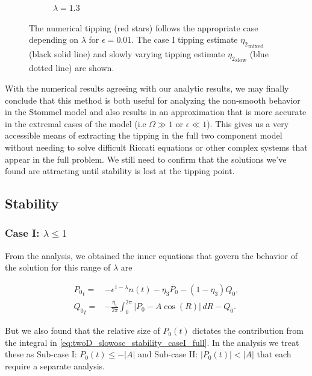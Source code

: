 \begin{figure}[H]
\begin{subfigure}{.5\textwidth}
 \caption{$\lambda=1.3$}
\end{subfigure}
\caption{The numerical tipping (red stars) follows the appropriate case depending on $\lambda$ for $\epsilon=0.01$. The case I tipping estimate ${\eta_2}_{\text{mixed}}$ (black solid line) and slowly varying tipping estimate ${\eta_2}_{\text{slow}}$ (blue dotted line) are shown.}
\label{fig:twoD_slowosc_epscomp}
\end{figure}

\indent With the numerical results agreeing with our analytic results, we may finally conclude that this method is both useful for analyzing the non-smooth behavior in the Stommel model and also results in an approximation that is more accurate in the extremal cases of the model (i.e $\Omega \gg 1$ or $\epsilon \ll 1$). This gives us a very accessible means of extracting the tipping in the full two component model without needing to solve difficult Riccati equations or other complex systems that appear in the full problem. We still need to confirm that the solutions we've found are attracting until stability is lost at the tipping point.

\subsection{Stability}

\subsubsection{Case I: $\lambda\le 1$}

From the analysis, we obtained the inner equations that govern the behavior of the solution for this range of $\lambda$ are

\begin{equation}\label{eq:twoD_slowosc_stability_caseI_full}
\begin{aligned}
{P_0}_t =& -\epsilon^{1-\lambda} n(t)-\eta_3 P_0 -(1-\eta_3)Q_0,\\
{Q_0}_t =& -\frac{\eta_1}{2\pi}\int_0^{2\pi}|P_0-A\cos(R)|\,dR - Q_0.
\end{aligned}
\end{equation}

But we also found that the relative size of $P_0(t)$ dictates the contribution from the integral in \eqref{eq:twoD_slowosc_stability_caseI_full}. In the analysis we treat these as Sub-case I: $P_0(t)\le-|A|$ and Sub-case II: $|P_0(t)|<|A|$ that each require a separate analysis.

